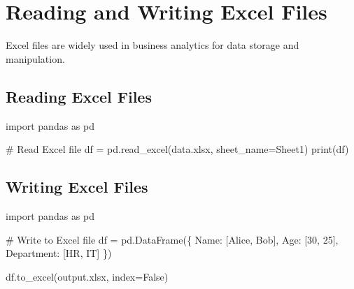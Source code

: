 \documentclass[
  letterpaper,
  DIV=11,
  numbers=noendperiod]{scrreprt}
\newenvironment{Shaded}{\begin{snugshade}}{\end{snugshade}}
\newcommand{\BuiltInTok}[1]{\textcolor[rgb]{0.00,0.23,0.31}{#1}}
\newcommand{\CommentTok}[1]{\textcolor[rgb]{0.37,0.37,0.37}{#1}}
\newcommand{\DecValTok}[1]{\textcolor[rgb]{0.68,0.00,0.00}{#1}}
\newcommand{\ImportTok}[1]{\textcolor[rgb]{0.00,0.46,0.62}{#1}}
\newcommand{\NormalTok}[1]{\textcolor[rgb]{0.00,0.23,0.31}{#1}}
\newcommand{\OperatorTok}[1]{\textcolor[rgb]{0.37,0.37,0.37}{#1}}
\newcommand{\StringTok}[1]{\textcolor[rgb]{0.13,0.47,0.30}{#1}}
\newcommand{\VariableTok}[1]{\textcolor[rgb]{0.07,0.07,0.07}{#1}}
\begin{document}
\section{Reading and Writing Excel
Files}\label{reading-and-writing-excel-files}

Excel files are widely used in business analytics for data storage and
manipulation.

\subsection{Reading Excel Files}\label{reading-excel-files}

\begin{Shaded}
\begin{Highlighting}[]
\ImportTok{import}\NormalTok{ pandas }\ImportTok{as}\NormalTok{ pd}

\CommentTok{\# Read Excel file}
\NormalTok{df }\OperatorTok{=}\NormalTok{ pd.read\_excel(}\StringTok{\textquotesingle{}data.xlsx\textquotesingle{}}\NormalTok{, sheet\_name}\OperatorTok{=}\StringTok{\textquotesingle{}Sheet1\textquotesingle{}}\NormalTok{)}
\BuiltInTok{print}\NormalTok{(df)}
\end{Highlighting}
\end{Shaded}

\subsection{Writing Excel Files}\label{writing-excel-files}

\begin{Shaded}
\begin{Highlighting}[]
\ImportTok{import}\NormalTok{ pandas }\ImportTok{as}\NormalTok{ pd}

\CommentTok{\# Write to Excel file}
\NormalTok{df }\OperatorTok{=}\NormalTok{ pd.DataFrame(\{}
    \StringTok{\textquotesingle{}Name\textquotesingle{}}\NormalTok{: [}\StringTok{\textquotesingle{}Alice\textquotesingle{}}\NormalTok{, }\StringTok{\textquotesingle{}Bob\textquotesingle{}}\NormalTok{],}
    \StringTok{\textquotesingle{}Age\textquotesingle{}}\NormalTok{: [}\DecValTok{30}\NormalTok{, }\DecValTok{25}\NormalTok{],}
    \StringTok{\textquotesingle{}Department\textquotesingle{}}\NormalTok{: [}\StringTok{\textquotesingle{}HR\textquotesingle{}}\NormalTok{, }\StringTok{\textquotesingle{}IT\textquotesingle{}}\NormalTok{]}
\NormalTok{\})}

\NormalTok{df.to\_excel(}\StringTok{\textquotesingle{}output.xlsx\textquotesingle{}}\NormalTok{, index}\OperatorTok{=}\VariableTok{False}\NormalTok{)}
\end{Highlighting}
\end{Shaded}
\end{document}
